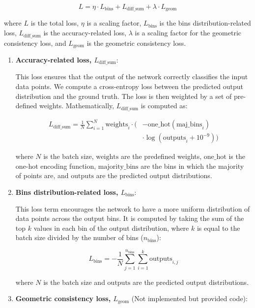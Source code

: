 \documentclass[sigconf, nonacm]{acmart}
\begin{document}
\[ L = \eta \cdot L_{\text{bins}} + L_{\text{diff\_sum}} + \lambda \cdot L_{\text{geom}} \]

where \(L\) is the total loss, \(\eta\) is a scaling factor, \(L_{\text{bins}}\) is the bins distribution-related loss, \(L_{\text{diff\_sum}}\) is the accuracy-related loss, \(\lambda\) is a scaling factor for the geometric consistency loss, and \(L_{\text{geom}}\) is the geometric consistency loss.

\begin{enumerate}
\item \textbf{Accuracy-related loss, \(L_{\text{diff\_sum}}\)}:

   This loss ensures that the output of the network correctly classifies the input data points. We compute a cross-entropy loss between the predicted output distribution and the ground truth. The loss is then weighted by a set of pre-defined weights. Mathematically, \(L_{\text{diff\_sum}}\) is computed as:

   \begin{align*}
   L_{\text{diff\_sum}} = \frac{1}{N} \sum_{i=1}^{N} \text{weights}_i \cdot \bigg(&- \text{one\_hot}(\text{maj\_bins}_i) \\
   &\cdot \log(\text{outputs}_i + 10^{-9}) \bigg)
   \end{align*}

   where \(N\) is the batch size, \(\text{weights}\) are the predefined weights, \(\text{one\_hot}\) is the one-hot encoding function, \(\text{majority\_bins}\) are the bins in which the majority of points are, and \(\text{outputs}\) are the predicted output distributions.

\item \textbf{Bins distribution-related loss, \(L_{\text{bins}}\)}:

   This loss term encourages the network to have a more uniform distribution of data points across the output bins. It is computed by taking the sum of the top \(k\) values in each bin of the output distribution, where \(k\) is equal to the batch size divided by the number of bins (\(n_{\text{bins}}\)):

   \[ L_{\text{bins}} = - \frac{1}{N} \sum_{j=1}^{n_{\text{bins}}} \sum_{i=1}^{k} \text{outputs}_{i,j} \]

   where \(N\) is the batch size and \(\text{outputs}\) are the predicted output distributions.

\item \textbf{Geometric consistency loss, \(L_{\text{geom}}\)} (Not implemented but provided code):


\end{enumerate}
\end{document}
